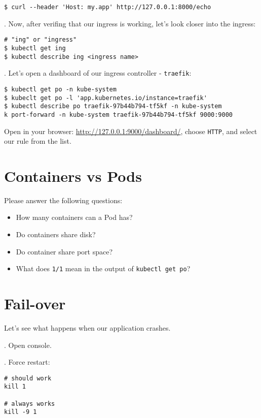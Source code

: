\documentclass[12pt, letterpaper]{article}
\begin{document}
\begin{verbatim}
$ curl --header 'Host: my.app' http://127.0.0.1:8000/echo
\end{verbatim}

. Now, after verifing that our ingress is working, let's look closer into the ingress:

\begin{verbatim}
# "ing" or "ingress"
$ kubectl get ing
$ kubectl describe ing <ingress name>
\end{verbatim}

. Let's open a dashboard of our ingress controller - \verb|traefik|:

\begin{verbatim}
$ kubectl get po -n kube-system
$ kubeclt get po -l 'app.kubernetes.io/instance=traefik'
$ kubectl describe po traefik-97b44b794-tf5kf -n kube-system
k port-forward -n kube-system traefik-97b44b794-tf5kf 9000:9000
\end{verbatim}

Open in your browser: \href{http://127.0.0.1:9000/dashboard/}{http://127.0.0.1:9000/dashboard/}, choose \verb|HTTP|, and select our rule from the list.

\section{Containers vs Pods}

Please answer the following questions:
\begin{itemize}
\item How many containers can a Pod has?
\item Do containers share disk?
\item Do container share port space?
\item What does \verb|1/1| mean in the output of \verb|kubectl get po|?
\end{itemize}

\bigskip
\bigskip

\section{Fail-over}
Let's see what happens when our application crashes.

. Open console.

. Force restart:

\begin{verbatim}
# should work
kill 1

# always works
kill -9 1
\end{verbatim}
\end{document}
